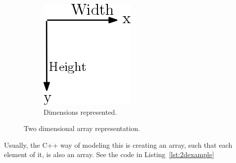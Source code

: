 \begin{figure}[htp]
\begin{subfigure}[b]{0.25\textwidth}
    \includegraphics[width=\textwidth]{img/arrow2D}
    \caption{Dimensions represented.}
    \label{fig:2b}
  \end{subfigure}
  \caption{Two dimensional array representation.}
  \label{fig:2D}
\end{figure}

Usually, the C++ way of modeling this is creating an array, such that each element of it, is also an array.
See the code in Listing~\ref{lst:2dexample}


